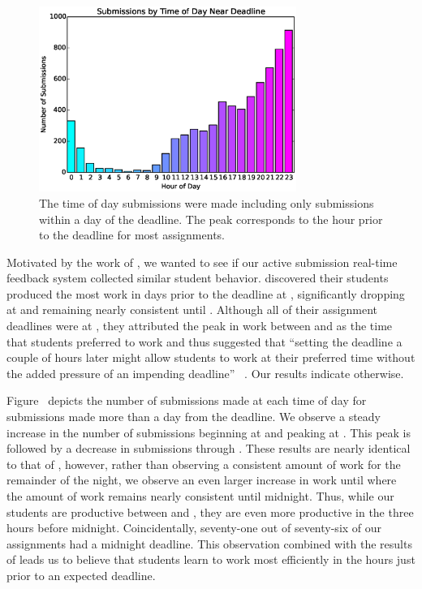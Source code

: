\begin{figure}[!t]
\centering \includegraphics[width=3.3in]{graphs/Submissions_by_Time_of_Day_Near_Deadline.eps}
\caption{The time of day submissions were made including only submissions
  within a day of the deadline. The  peak corresponds to the hour prior
  to the deadline for most assignments.}
\end{figure}

Motivated by the work of \spacco{}, we wanted to see if our active submission
real-time feedback system collected similar student behavior. \spacco{}
discovered their students produced the most work in days prior to the deadline
at , significantly dropping at  and remaining nearly consistent
until . Although all of their assignment deadlines were at , they
attributed the peak in work between  and  as the time that students
preferred to work and thus suggested that ``setting the deadline a couple of
hours later might allow students to work at their preferred time without the
added pressure of an impending deadline''
~\cite{Spacco:2013:TIP:2462476.2465594}. Our results indicate otherwise.

Figure~ depicts the number of submissions made at
each time of day for submissions made more than a day from the deadline. We
observe a steady increase in the number of submissions beginning at  and
peaking at . This peak is followed by a decrease in submissions through
. These results are nearly identical to that of \spacco{}, however,
rather than observing a consistent amount of work for the remainder of the
night, we observe an even larger increase in work until  where the amount
of work remains nearly consistent until midnight. Thus, while our students are
productive between  and , they are even more productive in the
three hours before midnight. Coincidentally, seventy-one out of seventy-six of
our assignments had a midnight deadline. This observation combined with the
results of \spacco{} leads us to believe that students learn to work most
efficiently in the hours just prior to an expected deadline.

